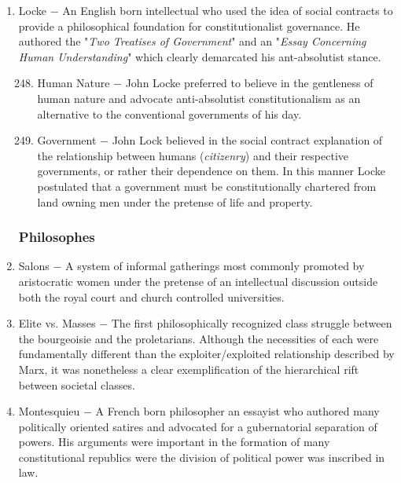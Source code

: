 \documentclass[12pt]{article}
\begin{document}
\begin{enumerate}
\begin{enumerate}[label=\arabic{*}.]
\end{enumerate}
\setcounter{enumi}{246}

\item Locke $-$ An English born intellectual who used the idea of social contracts to provide a philosophical foundation for constitutionalist governance. He authored the "\textit{Two Treatises of Government}" and an "\textit{Essay Concerning Human Understanding}" which clearly demarcated his ant-absolutist stance.

\begin{enumerate}[label=\arabic{*}.]
\setcounter{enumii}{247}

\item Human Nature $-$ John Locke preferred to believe in the gentleness of human nature and advocate anti-absolutist constitutionalism as an alternative to the conventional governments of his day.

\item Government $-$ John Lock believed in the social contract explanation of the relationship between humans (\textit{citizenry}) and their respective governments, or rather their dependence on them. In this manner Locke postulated that a government must be constitutionally chartered from land owning men under the pretense of life and property.

\end{enumerate}
\setcounter{enumi}{249}
\subsubsection{Philosophes}

\item Salons $-$ A system of informal gatherings most commonly promoted by aristocratic women under the pretense of an intellectual discussion outside both the royal court and church controlled universities.

\item Elite vs. Masses $-$ The first philosophically recognized class struggle between the bourgeoisie and the proletarians. Although the necessities of each were fundamentally different than the exploiter/exploited relationship described by Marx, it was nonetheless a clear exemplification of the hierarchical rift between societal classes.

\item Montesquieu $-$ A French born philosopher an essayist who authored many politically oriented satires and advocated for a gubernatorial separation of powers. His arguments were important in the formation of many constitutional republics were the division of political power was inscribed in law.


\end{enumerate}
\end{document}
